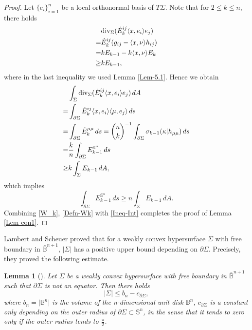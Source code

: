 \documentclass[11pt,reqno]{amsart}
\newtheorem{lem}[thm]{Lemma}
\theoremstyle{definition}
\theoremstyle{remark}
\numberwithin{equation}{section}
\renewcommand{\(}{\left(}
\renewcommand{\)}{\right)}
\renewcommand{\-}{\overline}
\begin{document}
\begin{proof}
Let $\{e_i\}_{i=1}^n$ be a local orthonormal basis of $T\Sigma$. Note that for $2\leq k\leq n$, there holds
\begin{align}
	&\mathrm{div}_{\Sigma}(\dot{E}_k^{ij}\langle x,e_i\rangle e_j)\notag\\
	=&\dot{E}_k^{ij}(g_{ij}-\langle x,\nu\rangle h_{ij})\notag\\
	=&kE_{k-1}-k\langle x,\nu\rangle E_k\notag\\
	\geq&kE_{k-1},\label{DivE_k}
\end{align}
where in the last inequality we  used Lemma \ref{Lem-5.1}. Hence we obtain
\begin{align}
	&\int_{\Sigma}{\mathrm{div}_{\Sigma}(\dot{E}_k^{ij}\langle x,e_i\rangle e_j)}\,dA\notag\\
	=&\int_{\partial\Sigma}{\dot{E}_k^{ij}\langle x,e_i\rangle\langle\mu,e_j\rangle}\,ds\notag\\
	=&\int_{\partial\Sigma}{\dot{E}_k^{\mu\mu}}\,ds=\binom{n}{k}^{-1}\int_{\partial\Sigma}{\sigma_{k-1}(\kappa|h_{\mu\mu})}\,ds\notag\\	
	=&\frac{k}{n}\int_{\partial\Sigma}{E_{k-1}^{\mathbb{S}^n}}\,ds\notag\\
	\geq&k\int_{\Sigma}{E_{k-1}}\,dA,
\end{align}
which implies
\begin{equation}\label{Ineq-Int}
	\int_{\partial\Sigma}{E_{k-1}^{\mathbb{S}^n}}\,ds\geq n\int_{\Sigma}{E_{k-1}}\,dA.
\end{equation}
Combining \eqref{W_k}, \eqref{Defn-Wk} with \eqref{Ineq-Int} completes the proof of Lemma \ref{Lem-con1}.
\end{proof}

Lambert and Scheuer \cite[Lemma 3.4]{Lambert-Scheuer2017} proved that for a weakly convex hypersurface $\Sigma$ with free boundary in $\bar{\mathbb{B}}^{n+1}$, $|\Sigma|$ has a positive upper bound depending on $\partial\Sigma$. Precisely, they proved the following estimate.

\begin{lem}[\cite{Lambert-Scheuer2017}]\label{lem-area-L}
	Let $\Sigma$ be a weakly convex hypersurface with free boundary in $\bar{\mathbb{B}}^{n+1}$ such that $\partial\Sigma$ is not an equator. Then there holds
	\begin{equation}
		|\Sigma|\leq b_n-c_{\partial\Sigma},
	\end{equation}
	where $b_n=\vert\mathbb{B}^n\vert$ is the volume of the  n-dimensional unit disk $\mathbb{B}^n$,  $c_{\partial\Sigma}$ is a constant only depending on the outer radius of $\partial\Sigma\subset\mathbb{S}^n$, in the sense that it tends to zero only if the outer radius tends to $\frac{\pi}{2}$.
\end{lem}
\end{document}
